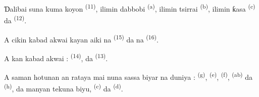Ɗalibai suna kuma koyon 
\textsuperscript{(11)}, ilimin dabbobi \textsuperscript{(a)}, ilimin
tsirrai \textsuperscript{(b)}, ilimin ƙasa \textsuperscript{(c)} da
 \textsuperscript{(12)}.

A cikin kabad akwai kayan aiki na 
\textsuperscript{(15)} da na 
\textsuperscript{(16)}.

A kan kabad akwai :  \textsuperscript{(14)},
 da  \textsuperscript{(13)}.

A saman hotunan an rataya  mai nuna sassa biyar na
duniya :  \textsuperscript{(g)}, 
\textsuperscript{(e)},  \textsuperscript{(f)},
 \textsuperscript{(ab)} da 
\textsuperscript{(h)}, da manyan tekuna biyu, 
\textsuperscript{(c)} da 
\textsuperscript{(d)}.

\VUsaut{6.0mm}
\VUfilet{22mm}
